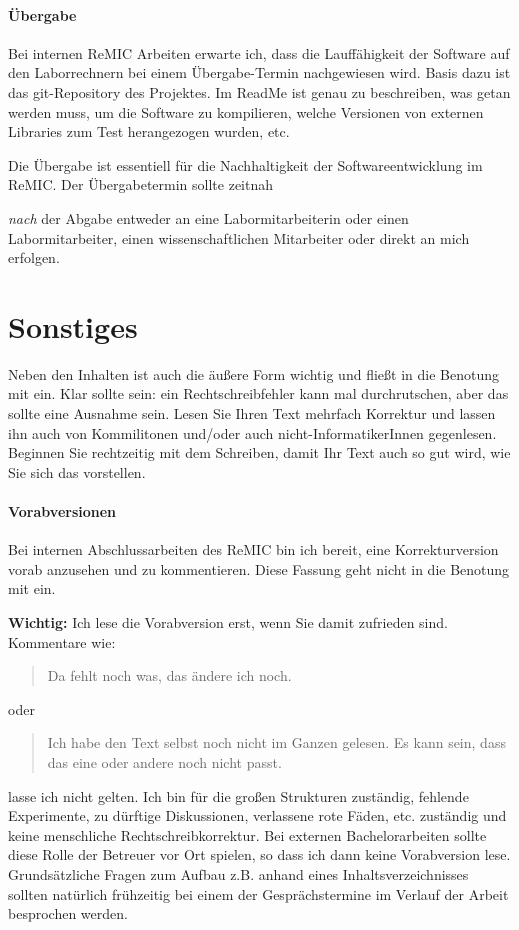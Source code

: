 \paragraph{Übergabe} Bei internen ReMIC Arbeiten erwarte ich, dass die Lauffähigkeit der Software auf den Laborrechnern bei einem Übergabe-Termin nachgewiesen wird.
Basis dazu ist das git-Repository des Projektes.
Im ReadMe ist  genau zu beschreiben, was getan werden muss, um die Software zu kompilieren, welche Versionen von externen Libraries zum Test herangezogen wurden, etc.

Die Übergabe ist essentiell für die Nachhaltigkeit der Softwareentwicklung im ReMIC.
Der Übergabetermin sollte zeitnah {\emph{nach} der Abgabe entweder an eine Labormitarbeiterin oder einen Labormitarbeiter, einen wissenschaftlichen Mitarbeiter oder direkt an mich erfolgen.








\section{Sonstiges}
\label{everythingelse}

Neben den Inhalten ist auch die äußere Form wichtig und fließt in die Benotung mit ein.
Klar sollte sein: ein Rechtschreibfehler kann mal durchrutschen, aber das sollte eine Ausnahme sein.
Lesen Sie Ihren Text mehrfach Korrektur und lassen ihn auch von Kommilitonen und/oder auch nicht-InformatikerInnen gegenlesen.
Beginnen Sie rechtzeitig mit dem Schreiben, damit Ihr Text auch so gut wird, wie Sie sich das vorstellen.

\paragraph{Vorabversionen}
Bei internen Abschlussarbeiten des ReMIC bin ich bereit, eine Korrekturversion vorab anzusehen und zu kommentieren.
Diese Fassung geht nicht in die Benotung mit ein.

\textbf{Wichtig:} Ich lese die Vorabversion erst, wenn Sie damit zufrieden sind. Kommentare wie:
\begin{quote}
\glqq Da fehlt noch was, das ändere ich noch.\grqq
\end{quote}
oder
\begin{quote}
\glqq Ich habe den Text selbst noch nicht im Ganzen gelesen. Es kann sein, dass das eine oder andere noch nicht passt.\glqq
\end{quote}
lasse ich nicht gelten. Ich bin für die großen Strukturen zuständig, fehlende Experimente, zu dürftige Diskussionen, verlassene rote Fäden, etc. zuständig und keine menschliche Rechtschreibkorrektur.
Bei externen Bachelorarbeiten sollte diese Rolle der Betreuer vor Ort spielen, so dass ich dann keine Vorabversion lese.
Grundsätzliche Fragen zum Aufbau z.B. anhand eines Inhaltsverzeichnisses sollten natürlich frühzeitig bei einem der Gesprächstermine im Verlauf der Arbeit besprochen werden.

}
